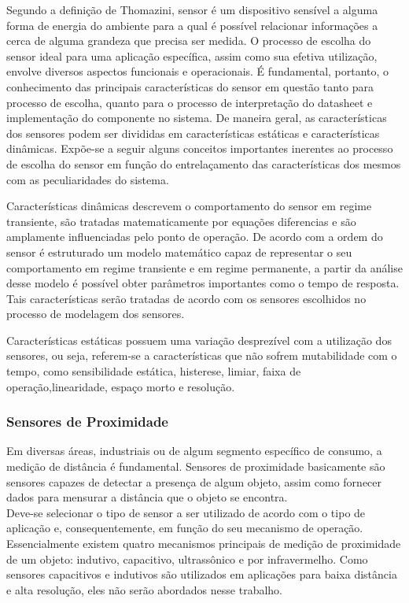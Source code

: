			Segundo a definição de Thomazini, sensor é um dispositivo sensível a alguma forma de energia do ambiente para a qual é possível relacionar informações a cerca de alguma grandeza que precisa ser medida. O processo de escolha do sensor ideal para uma aplicação específica, assim como sua efetiva utilização, envolve diversos aspectos funcionais e operacionais. É fundamental, portanto, o conhecimento das principais características do sensor em questão tanto para processo de escolha, quanto para o processo de interpretação do datasheet e implementação do componente no sistema. De maneira geral, as características dos sensores podem ser divididas em características estáticas e características dinâmicas. Expõe-se a seguir alguns conceitos importantes inerentes ao processo de escolha do sensor em função do entrelaçamento das características dos mesmos com as peculiaridades do sistema.
				
			Características dinâmicas descrevem o comportamento do sensor em regime transiente, são tratadas matematicamente por equações diferencias e são amplamente influenciadas pelo ponto de operação. De acordo com a ordem do sensor é estruturado um modelo matemático capaz de representar o seu comportamento em regime transiente e em regime permanente, a partir da análise desse modelo é possível obter parâmetros importantes como o tempo de resposta. Tais características serão tratadas de acordo com os sensores escolhidos no processo de modelagem dos sensores.
				
			Características estáticas possuem uma variação desprezível com a utilização dos sensores, ou seja, referem-se a características que não sofrem mutabilidade com o tempo, como sensibilidade estática, histerese, limiar, faixa de operação,linearidade, espaço morto e resolução. 

			\subsubsection{Sensores de Proximidade}
				Em diversas áreas, industriais ou de algum segmento específico de consumo, a medição de distância é fundamental. Sensores de proximidade basicamente são sensores capazes de detectar a presença de algum objeto, assim como fornecer dados para mensurar a distância que o objeto se encontra. \\
				Deve-se selecionar o tipo de sensor a ser utilizado de acordo com o tipo de aplicação e, consequentemente, em função do seu mecanismo de operação. Essencialmente existem quatro mecanismos principais de medição de proximidade de um objeto: indutivo, capacitivo, ultrassônico e por infravermelho. Como sensores capacitivos e indutivos são utilizados em aplicações para baixa distância e alta resolução, eles não serão abordados nesse trabalho. 

